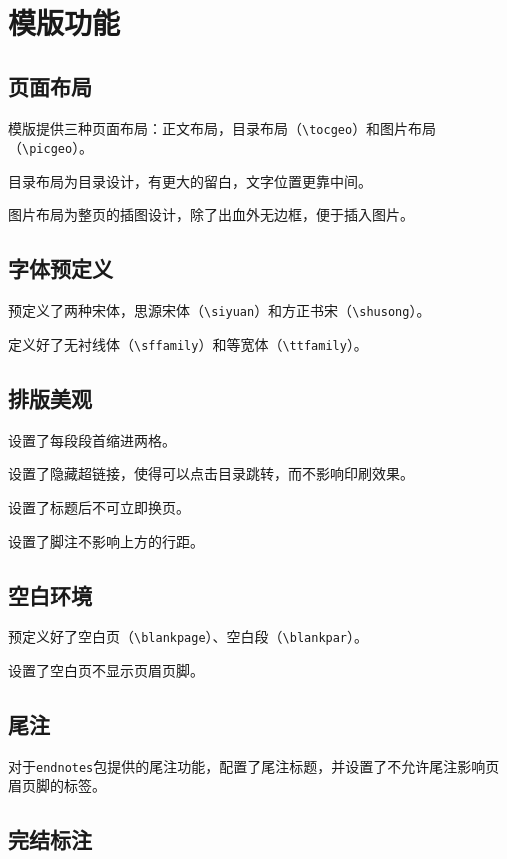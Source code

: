 \documentclass[10pt,openany]{book}
\begin{document}
\chapter{模版功能}
\label{template-feature}

\section{页面布局}

模版提供三种页面布局：正文布局，目录布局（\verb|\tocgeo|）和图片布局（\verb|\picgeo|）。

目录布局为目录设计，有更大的留白，文字位置更靠中间。

图片布局为整页的插图设计，除了出血外无边框，便于插入图片。

\section{字体预定义}

预定义了两种宋体，思源宋体（\verb|\siyuan|）和方正书宋（\verb|\shusong|）。

定义好了无衬线体（\verb|\sffamily|）和等宽体（\verb|\ttfamily|）。

\section{排版美观}

设置了每段段首缩进两格。

设置了隐藏超链接，使得可以点击目录跳转，而不影响印刷效果。

设置了标题后不可立即换页。

设置了脚注不影响上方的行距。

\section{空白环境}

预定义好了空白页（\verb|\blankpage|）、空白段（\verb|\blankpar|）。

设置了空白页不显示页眉页脚。

\section{尾注}

对于\verb|endnotes|包提供的尾注功能，配置了尾注标题，并设置了不允许尾注影响页眉页脚的标签。

\section{完结标注}
\end{document}
